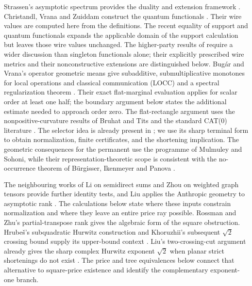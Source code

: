 \documentclass[11pt,a4paper]{article}
\theoremstyle{definition}
\theoremstyle{remark}
\begin{document}
Strassen's asymptotic spectrum provides the duality and
extension framework \cite{Strassen1988,wz-spectra}.
Christandl, Vrana and Zuiddam construct the quantum functionals
\cite{cvz-universal}. Their wire values are computed here from
the definitions.
The recent equality of support and quantum functionals
\cite[Theorem I.1]{sdw-support} expands the applicable domain
of the support calculation but leaves those wire values unchanged.
The higher-party results of \cite{bcfln-quantum,alp-edge}
require a wider discussion than singleton functionals alone;
their explicitly prescribed wire metrics and their
nonconstructive extensions are distinguished below.
Bug\'ar and Vrana's operator geometric means give subadditive,
submultiplicative monotones for local operations and classical
communication (LOCC) and a spectral regularization theorem
\cite{BugarVrana2025}. Their exact flat-marginal evaluation applies
for scalar order at least one half; the boundary argument below
states the additional estimate needed to approach order zero.
The flat-rectangle argument uses the nonpositive-curvature
results of Bruhat and Tits and the standard CAT(0) literature
\cite{BT1972,BH1999,BN2008}.
The selector idea is already present in
\cite[Lemma E.7, p.~35]{Anthropic2026};
we use its sharp terminal form to obtain normalization,
finite certificates, and the shortening implication.
The geometric consequences for the permanent use the
programme of Mulmuley and Sohoni, while their
representation-theoretic scope is consistent with the
no-occurrence theorem of B\"urgisser, Ikenmeyer and Panova
\cite{MulmuleySohoni2001,BurgisserIkenmeyerPanova2019}.

The neighbouring works of Li on semidirect sums and Zhou on
weighted graph tensors provide further identity tests,
and Liu applies the Anthropic geometry to asymptotic rank
\cite{Li2026,Zhou2026,Liu2026}.
The calculations below state where these inputs constrain
normalization and where they leave an entire price ray possible.
Rossman and Zhu's partial-transpose rank
\cite[Definition 3.4]{RossmanZhu2026} gives the algebraic
form of the square obstruction.
Hrube\v{s}'s subquadratic Hurwitz construction and Khoruzhii's
subsequent $\sqrt2$ crossing bound supply its upper-bound
context \cite{Hrubes2026,Khoruzhii2026}.
Liu's two-crossing-cut argument already gives the sharp complex
Hurwitz exponent $\sqrt2$ when planar strict shortenings do not
exist \cite[Section 2, Two crossing cuts, p.~3]{Liu2026noncommutative}.
The price and tree equivalences below connect that alternative
to square-price existence and identify the complementary
exponent-one branch.
\end{document}
